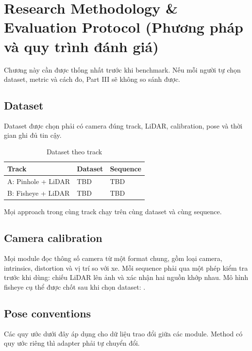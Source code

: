 \chapter{Research Methodology \& Evaluation Protocol (Phương pháp và quy trình đánh giá)}

Chương này cần được thống nhất trước khi benchmark.
Nếu mỗi người tự chọn dataset, metric và cách đo, Part III sẽ không so sánh được.

\section{Dataset}

Dataset được chọn phải có camera đúng track, LiDAR, calibration, pose và thời gian ghi đủ tin cậy.

\begin{table}[H]
  \centering
  \caption{Dataset theo track}
  \begin{tabularx}{\linewidth}{l X X}
    \toprule
    \textbf{Track} & \textbf{Dataset} & \textbf{Sequence} \\
    \midrule
    A: Pinhole + LiDAR & TBD & TBD \\
    B: Fisheye + LiDAR & TBD & TBD \\
    \bottomrule
  \end{tabularx}
\end{table}

Mọi approach trong cùng track chạy trên cùng dataset và cùng sequence.

\section{Camera calibration}

Mọi module đọc thông số camera từ một format chung, gồm loại camera, intrinsics, distortion và vị trí so với xe.
Mỗi sequence phải qua một phép kiểm tra trước khi dùng: chiếu LiDAR lên ảnh và xác nhận hai nguồn khớp nhau.
Mô hình fisheye cụ thể được chốt sau khi chọn dataset: .

\section{Pose conventions}

Các quy ước dưới đây áp dụng cho dữ liệu trao đổi giữa các module. Method có quy ước riêng thì adapter phải tự chuyển đổi.

